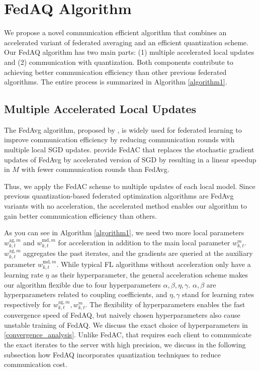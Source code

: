 \section{FedAQ Algorithm}

We propose a novel communication efficient algorithm that combines an accelerated variant of federated averaging and an efficient quantization scheme. Our FedAQ algorithm has two main parts: (1) multiple accelerated local updates and (2) communication with quantization. Both components contribute to achieving better communication efficiency than other previous federated algorithms. The entire process is summarized in Algorithm \ref{algorithm1}. %

\subsection{Multiple Accelerated Local Updates}

The FedAvg algorithm, proposed by \citet{mcmahan2017communication}, is widely used for federated learning to improve communication efficiency by reducing communication rounds with multiple local SGD updates. \citet{yuan2020federated} provide FedAC that replaces the stochastic gradient updates of FedAvg by accelerated version of SGD by \citet{ghadimi2012optimal} resulting in a linear speedup in $M$ with fewer communication rounds than FedAvg. 

Thus, we apply the FedAC scheme to multiple updates of each local model. Since previous quantization-based federated optimization algorithms are FedAvg variants with no acceleration, the accelerated method enables our algorithm to gain better communication efficiency than others. 

As you can see in Algorithm \ref{algorithm1}, we need two more local parameters $w_{k, t}^{\textrm{ag}, m}$ and $w_{k, t}^{\textrm{md}, m}$ for acceleration in addition to the main local parameter $w_{k, t}^m$. $w_{k,t}^{\textrm{ag},m}$ aggregates the past iterates, and the gradients are queried at the auxiliary parameter $w_{k,t}^{\textrm{md},m}$. While typical FL algorithms without acceleration only have a learning rate $\eta$ as their hyperparameter, the general acceleration scheme makes our algorithm flexible due to four hyperparameters $\alpha, \beta, \eta, \gamma$. $\alpha, \beta$ are hyperparameters related to coupling coefficients, and $\eta, \gamma$ stand for learning rates respectively for $w_{k, t}^{\textrm{ag}, m}, w_{k, t}^m$. The flexibility of hyperparameters enables the fast convergence speed of FedAQ, but naively chosen hyperparameters also cause unstable training of FedAQ. We discuss the exact choice of hyperparameters in \cref{convergence_analysis}. Unlike FedAC, that requires each client to communicate the exact iterates to the server with high precision, we discuss in the following subsection how FedAQ incorporates quantization techniques to reduce communication cost.


